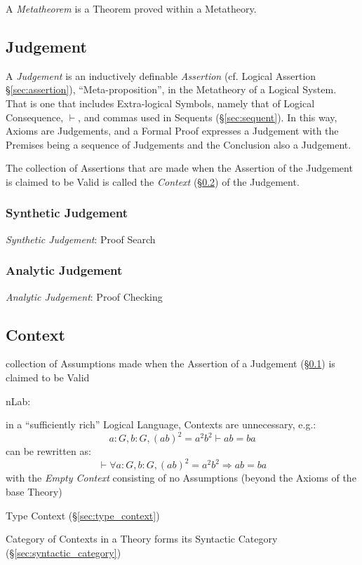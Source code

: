 A \emph{Metatheorem} is a Theorem proved within a Metatheory.



\subsection{Judgement}\label{sec:judgement}

A \emph{Judgement} is an inductively definable \emph{Assertion} (cf. Logical
Assertion \S\ref{sec:assertion}), ``Meta-proposition'', in the Metatheory of a
Logical System. That is one that includes Extra-logical Symbols, namely that of
Logical Consequence, $\vdash$, and commas used in Sequents
(\S\ref{sec:sequent}). In this way, Axioms are Judgements, and a Formal Proof
expresses a Judgement with the Premises being a sequence of Judgements and the
Conclusion also a Judgement.

The collection of Assertions that are made when the Assertion of the
Judgement is claimed to be Valid is called the \emph{Context}
(\S\ref{sec:context}) of the Judgement.



\subsubsection{Synthetic Judgement}\label{sec:synthetic_judgement}

\emph{Synthetic Judgement}: Proof Search



\subsubsection{Analytic Judgement}\label{sec:analytic_judgement}

\emph{Analytic Judgement}: Proof Checking



\subsection{Context}\label{sec:context}

collection of Assumptions made when the Assertion of a Judgement
(\S\ref{sec:judgement}) is claimed to be Valid

nLab:

in a ``sufficiently rich'' Logical Language, Contexts are unnecessary,
e.g.:
\[
  a:G, b:G, (ab)^2 = a^2 b^2 \vdash ab = ba
\]
can be rewritten as:
\[
  \vdash \forall a:G,b:G, (ab)^2 = a^2b^2 \Rightarrow ab = ba
\]
with the \emph{Empty Context} consisting of no Assumptions (beyond the
Axioms of the base Theory)

Type Context (\S\ref{sec:type_context})

Category of Contexts in a Theory forms its Syntactic Category
(\S\ref{sec:syntactic_category})
